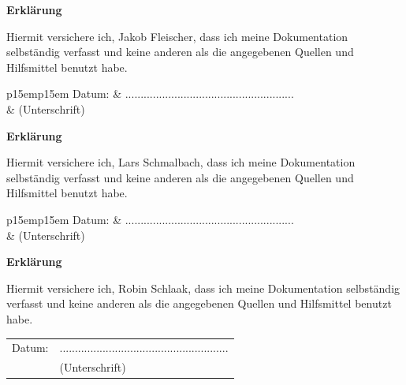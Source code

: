 \documentclass[12pt,a4paper,bibliography=totocnumbered,listof=totocnumbered]{scrartcl}
\begin{document}
\newpage
\thispagestyle{empty}
\begin{center}
	\vspace*{5em}
	\huge\textbf{Erklärung}\\
\end{center}
\vspace{2em}
Hiermit versichere ich, Jakob Fleischer, dass ich meine Dokumentation selbständig verfasst und keine anderen als die angegebenen Quellen und Hilfsmittel benutzt habe.

\vspace{4em}
\begin{minipage}{\linewidth}
	\begin{tabular}{p{15em}p{15em}}
		Datum: &  .......................................................\\
		& \centering (Unterschrift)\\
	\end{tabular}
\end{minipage}

\newpage
\thispagestyle{empty}
\begin{center}
	\vspace*{5em}
	\huge\textbf{Erklärung}\\
\end{center}
\vspace{2em}
Hiermit versichere ich, Lars Schmalbach, dass ich meine Dokumentation selbständig verfasst und keine anderen als die angegebenen Quellen und Hilfsmittel benutzt habe.

\vspace{4em}
\begin{minipage}{\linewidth}
	\begin{tabular}{p{15em}p{15em}}
		Datum: &  .......................................................\\
		& \centering (Unterschrift)\\
	\end{tabular}
\end{minipage}

\newpage
\thispagestyle{empty}
\begin{center}
	\vspace*{5em}
	\huge\textbf{Erklärung}\\
\end{center}
\vspace{2em}
Hiermit versichere ich, Robin Schlaak, dass ich meine Dokumentation selbständig verfasst und keine anderen als die angegebenen Quellen und Hilfsmittel benutzt habe.

\vspace{4em}
\begin{minipage}{\linewidth}
	\begin{tabular}{p{15em}p{15em}}
		Datum: &  .......................................................\\
		& \centering (Unterschrift)\\
	\end{tabular}
\end{minipage}
\end{document}
